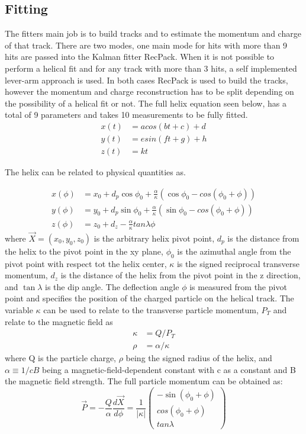 \subsection{Fitting}
The fitters main job is to build tracks and to estimate the momentum and charge of that track. There are two modes, one main mode for hits with more than 9 hits are passed into the Kalman fitter RecPack. When it is not possible to perform a helical fit and for any track with more than 3 hits, a self implemented lever-arm approach is used. In both cases RecPack is used to build the tracks, however the momentum and charge reconstruction has to be split depending on the possibility of a helical fit or not. The full helix equation seen below, has a total of 9 parameters and takes 10 measurements to be fully fitted.  
\begin{align}
x(t) &= acos(bt+c)+d\\
y(t) &= esin(ft+g) + h\\
z(t) &= kt
\end{align}

The helix can be related to physical quantities as.

\begin{align}
x(\phi) &= x_0 + d_p \cos \phi_0 + \frac{\alpha}{\kappa}(\cos \phi_0 - cos(\phi_0 + \phi))\\ 
y(\phi) &= y_0 + d_p \sin \phi_0 + \frac{\alpha}{\kappa}(\sin \phi_0 - cos(\phi_0 + \phi))\\
z(\phi) &= z_0 + d_z - \frac{\alpha}{\kappa} tan \lambda \phi
\end{align}
where $\vec{X} = (x_0, y_0, z_0)$ is the arbitrary helix pivot point, $d_p$ is the distance from the helix to the pivot point in the xy plane, $\phi_0$ is the azimuthal angle from the pivot point with respect tot the helix center, $\kappa$ is the signed reciprocal transverse momentum, $d_z$ is the distance of the helix from the pivot point in the z direction, and $\tan\lambda$ is the dip angle. The deflection angle $\phi$ is measured from the pivot point and specifies the position of the charged particle on the helical track. The variable $\kappa$ can be used to relate to the transverse particle momentum, $P_T$ and relate to the magnetic field as 
\begin{align}
 \kappa &=  Q/P_T \\  
 \rho &=  \alpha/\kappa
 \end{align}
where Q is the particle charge, $\rho$ being the signed radius of the helix, and $\alpha \equiv 1/c B$ being a magnetic-field-dependent constant with c as a constant and B the magnetic field strength. The full particle momentum can be obtained as: 
\begin{equation}
\vec{P} = - \frac{Q}{\alpha} \frac{d\vec{X}}{d\phi} = \frac{1}{|\kappa |} 
 \begin{pmatrix}
 -\sin(\phi_0 + \phi)\\
 cos(\phi_0 + \phi)\\
 tan\lambda
 \end{pmatrix}
\end{equation}

